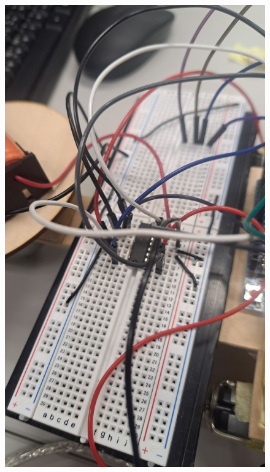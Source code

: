 \documentclass[a4paper,12pt]{article}
\begin{document}
\begin{center}
\begin{figure}[H]
\begin{minipage}[t]{0.45\textwidth}
\includegraphics[width=\textwidth]{./photos/f.jpg}
\end{minipage}
\hfill
\end{figure}\FloatBarrier\end{center}
\end{document}
